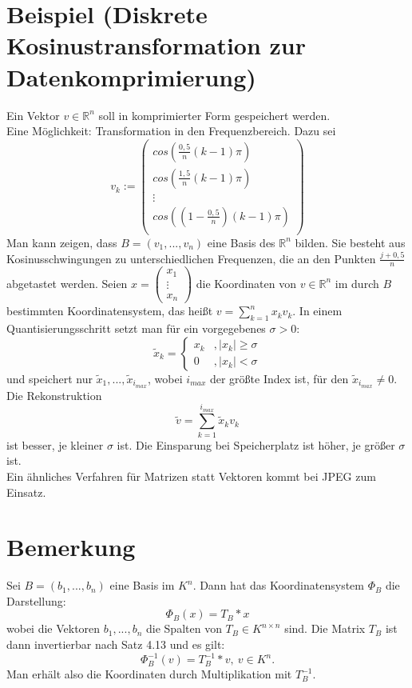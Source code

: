 \documentclass{scrbook}
\begin{document}
\section{Beispiel (Diskrete Kosinustransformation zur Datenkomprimierung)}
Ein Vektor $v\in \mathbb{R}^n$ soll in komprimierter Form gespeichert werden.\\Eine Möglichkeit: Transformation in den Frequenzbereich. Dazu sei\[
v_k:= \left(
\begin{array}{c}
cos\left(\frac{0,5}{n}(k-1)\pi\right)\\
cos\left(\frac{1,5}{n}(k-1)\pi\right)\\
\vdots\\
cos\left((1-\frac{0,5}{n})(k-1)\pi\right)\\
\end{array}
\right)
\]
Man kann zeigen, dass $B = (v_1,...,v_n)$ eine Basis des $\mathbb{R}^n$ bilden. Sie besteht aus Kosinusschwingungen zu unterschiedlichen Frequenzen, die an den Punkten $\frac{j+0,5}{n}$ abgetastet werden. Seien $x= \left(
\begin{array}{c}
x_1\\\vdots\\x_n
\end{array}
\right)$ die Koordinaten von $v\in \mathbb{R}^n$ im durch $B$ bestimmten Koordinatensystem, das heißt $v=\sum^n_{k=1}x_kv_k$. In einem Quantisierungsschritt setzt man für ein vorgegebenes $\sigma>0$:
\[
\tilde{x}_k=\left\{\begin{array}{cc}
x_k&,|x_k|\geq \sigma\\
0&,|x_k|<\sigma
\end{array}\right.
\] und speichert nur $\tilde{x}_1,...,\tilde{x}_{i_{max}}$, wobei $i_{max}$ der größte Index ist, für den $\tilde{x}_{i_{max}} \neq 0$. Die Rekonstruktion
\[
\tilde{v} = \sum^{i_{max}}_{k=1} \tilde{x}_k v_k
\]
ist besser, je kleiner $\sigma$ ist. Die Einsparung bei Speicherplatz ist höher, je größer $\sigma$ ist.\\Ein ähnliches Verfahren für Matrizen statt Vektoren kommt bei JPEG zum Einsatz.
\section{Bemerkung}
Sei $B=(b_1,...,b_n)$ eine Basis im $K^n$. Dann hat das Koordinatensystem $\Phi_B$ die Darstellung:\[\Phi_B(x) = T_B*x\] wobei die Vektoren $b_1,...,b_n$ die Spalten von $T_B \in K^{n \times n}$ sind. Die Matrix $T_B$ ist dann invertierbar nach Satz 4.13 und es gilt:\[\Phi^{-1}_B(v) = T^{-1}_B*v,\ v\in K^n.\]
Man erhält also die Koordinaten durch Multiplikation mit $T^{-1}_B$.
\end{document}
